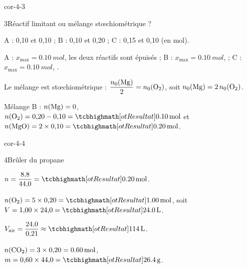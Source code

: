 \begin{blocLivre}{cor-4-3}
\begin{corrige}{3}{Réactif limitant ou mélange stœchiométrique ?}
\begin{questions}
\item A : 0,10 et 0,10 ; B : 0,10 et 0,20 ; C : 0,15 et 0,10 (en \unit{mol}).
\item A : $x_\mathrm{max}=\qty{0,10}{mol}$, les deux réactifs sont épuisés ; B : $x_\mathrm{max}=\qty{0,10}{mol}$,  ;
C : $x_\mathrm{max}=\qty{0,10}{mol}$, .
\item Le mélange  est stœchiométrique : $\dfrac{n_0(\ce{Mg})}{2}=n_0(\ce{O2})$, soit $n_0(\ce{Mg})=2\,n_0(\ce{O2})$.
\item Mélange B : $n(\ce{Mg})=0$, $n(\ce{O2})=0{,}20-0{,}10=\res{\qty{0,10}{mol}}$ et $n(\ce{MgO})=2\times0{,}10=\res{\qty{0,20}{mol}}$.
\end{questions}
\end{corrige}
\end{blocLivre}
\begin{blocLivre}{cor-4-4}
\begin{corrige}{4}{Brûler du propane}
\begin{questions}
\item $n=\dfrac{8{,}8}{44{,}0}=\res{\qty{0,20}{mol}}$.
\item $n(\ce{O2})=5\times0{,}20=\res{\qty{1,00}{mol}}$, soit $V=1{,}00\times24{,}0=\res{\qty{24,0}{L}}$.
\item $V_\text{air}=\dfrac{24{,}0}{0{,}21}\approx\res{\qty{114}{L}}$.
\item $n(\ce{CO2})=3\times0{,}20=\qty{0,60}{mol}$, $m=0{,}60\times44{,}0=\res{\qty{26,4}{g}}$.
\end{questions}
\end{corrige}
\end{blocLivre}
